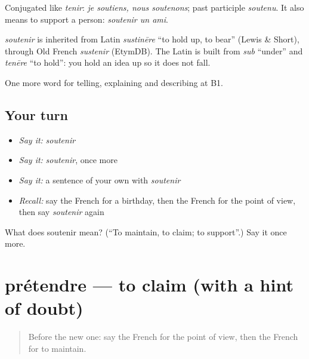 Conjugated like \emph{tenir}: \emph{je soutiens, nous soutenons}; past participle \emph{soutenu}. It also means to support a person: \emph{soutenir un ami}.

\begin{cousinweb}
\emph{soutenir} is inherited from Latin \emph{sustinēre} \textquotedblleft{}to hold up, to bear\textquotedblright{} (Lewis \& Short), through Old French \emph{sustenir} (EtymDB). The Latin is built from \emph{sub} \textquotedblleft{}under\textquotedblright{} and \emph{tenēre} \textquotedblleft{}to hold\textquotedblright{}: you hold an idea up so it does not fall.
\end{cousinweb}

\begin{grammarlens}[title={What you've built}]
One more word for telling, explaining and describing at B1.
\end{grammarlens}

\subsection*{Your turn}
\begin{itemize}
\raggedright
  \item \emph{Say it:} \emph{soutenir}
  \item \emph{Say it:} \emph{soutenir}, once more
  \item \emph{Say it:} a sentence of your own with \emph{soutenir}
  \item \emph{Recall:} say the French for a birthday, then the French for the point of view, then say \emph{soutenir} again
\end{itemize}

\begin{tcolorbox}[breakable,colback=teal!4,colframe=teal!35!black,title={Before you move on}]
What does soutenir mean? (\textquotedblleft{}To maintain, to claim; to support\textquotedblright{}.) Say it once more.
\end{tcolorbox}
\section[prétendre]{prétendre — to claim (with a hint of doubt)}

\label{lesson:FR-C334-pretendre}



\begin{quote}
Before the new one: say the French for the point of view, then the French for to maintain.
\end{quote}

